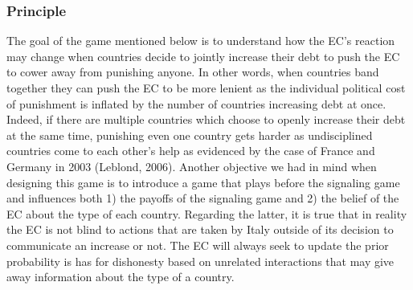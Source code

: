 \documentclass{article}
\begin{document}
\subsubsection{Principle}
The goal of the game mentioned below is to understand how the EC's reaction may change when countries decide to jointly increase their debt to push the EC to cower away from punishing anyone. In other words, when countries band together they can push the EC to be more lenient as the individual political cost of punishment is inflated by the number of countries increasing debt at once. Indeed, if there are multiple countries which choose to openly increase their debt at the same time, punishing even one country gets harder as undisciplined countries come to each other's help as evidenced by the case of France and Germany in 2003 (Leblond, 2006).
Another objective we had in mind when designing this game is to introduce a game that plays before the signaling game and influences both 1) the payoffs of the signaling game and 2) the belief of the EC about the type of each country. Regarding the latter, it is true that in reality the EC is not blind to actions that are taken by Italy outside of its decision to communicate an increase or not. The EC will always seek to update the prior probability is has for dishonesty based on unrelated interactions that may give away information about the type of a country. 
\end{document}
